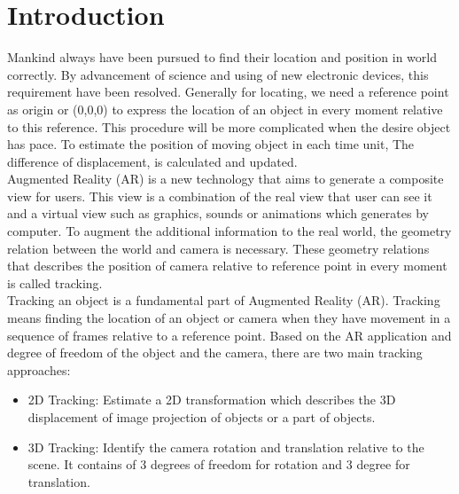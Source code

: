 \chapter{Introduction}\label{chapter:introduction}
Mankind always have been pursued to find their location and position in world correctly. By advancement of science and using of new electronic devices, this requirement have been resolved. Generally for locating, we need a reference point as origin or (0,0,0) to express the location of an object in every moment relative to this reference. This procedure will be more complicated when the desire object has pace. To estimate the position of moving object in each time unit, The difference of displacement, is calculated and updated.\\
Augmented Reality (AR) is a new technology that aims to generate a composite view for users. This view is a combination of the real view that user can see it and a virtual view such as graphics, sounds or animations which generates by computer. To augment the additional information to the real world, the geometry relation between the world and camera is necessary. These geometry relations that describes the position of camera relative to reference point in every moment is called tracking.\\
Tracking an object is a fundamental part of Augmented Reality (AR). Tracking means finding the location of an object or camera when they have movement in a sequence of frames relative to a reference point. Based on the AR application and degree of freedom of the object and the camera, there are two main tracking approaches:

\begin{itemize}
\item 2D Tracking: Estimate a 2D transformation which describes the 3D displacement of image projection of objects or a part of objects.
\item 3D Tracking: Identify the camera rotation and translation relative to the scene. It contains of 3 degrees of freedom for rotation and 3 degree for translation.
\end{itemize}

